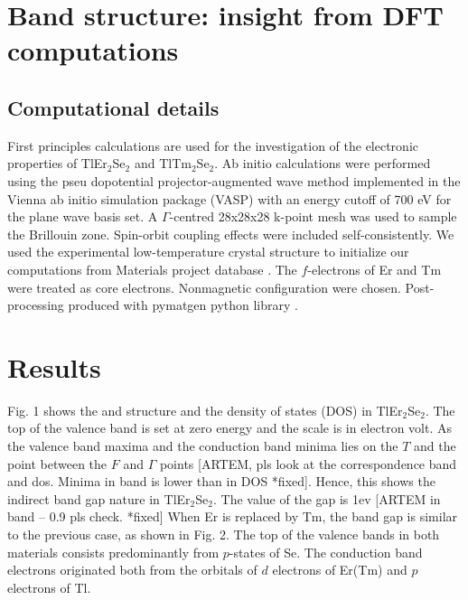 \documentclass[onecolumn]{revtex4}
\date{\today}
\begin{document}
\maketitle
\tableofcontents
\section{Band structure: insight from DFT computations}
\subsection{Computational details}

First principles calculations are used for the investigation of the electronic properties of TlEr$_2$Se$_2$ and TlTm$_2$Se$_2$. 
Ab initio calculations were performed using the pseu
dopotential projector-augmented wave method \cite{Kresse1999} implemented in the Vienna ab initio simulation package
(VASP) \cite{Kresse1996,Kresse1993} with an energy cutoff of 700 eV for the plane wave basis set. A $\Gamma$-centred  28x28x28 k-point mesh was used to sample the Brillouin zone. Spin-orbit coupling effects were included self-consistently. We used the experimental low-temperature crystal structure to initialize our
computations from Materials project database \cite{MaterialsProject}. The $ f $-electrons of Er and Tm were treated as core electrons. Nonmagnetic configuration were chosen. Post-processing produced with pymatgen python library \cite{Pymatgen}. 
 
\section{Results}
Fig. 1 shows the and structure and the density of states (DOS) in TlEr$_2$Se$_2$. The top of the valence band is set at zero energy and the scale is in electron volt. As the valence band maxima and the conduction band minima lies on the $T$ and the point between the $F$ and $\Gamma$ points [ARTEM, pls look at the correspondence band and dos. Minima in band is lower than in DOS *fixed]. Hence, this shows the indirect band gap nature in TlEr$_2$Se$_2$. The value of the gap is 1ev [ARTEM in band -- 0.9 pls check. *fixed] 
When Er is replaced by Tm, the band gap is similar to the previous case, as shown in Fig. 2. 
The top of the valence bands in both materials consists predominantly from $ p $-states of Se.
The conduction band electrons originated both from the orbitals of $ d $  electrons of Er(Tm) and $ p $  electrons of Tl.  
 
\end{document}
